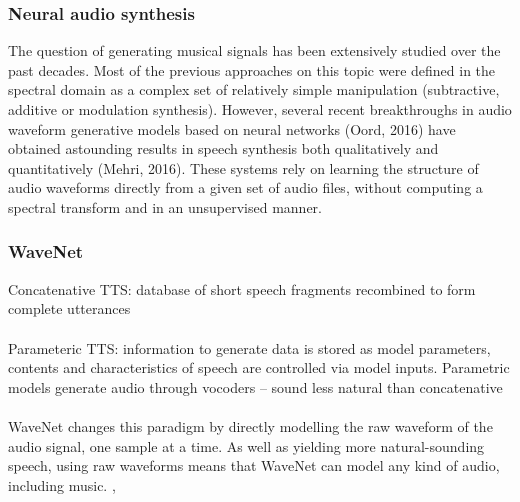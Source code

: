 \documentclass{beamer}
\begin{document}
\begin{frame}
\frametitle{Neural audio synthesis}
	The question of generating musical signals has been extensively studied over the past decades. Most of the previous approaches on this topic were defined in the spectral domain as a complex set of relatively simple manipulation (subtractive, additive or modulation synthesis). However, several recent breakthroughs in audio waveform generative models based on neural networks (Oord, 2016) have obtained astounding results in speech synthesis both qualitatively and quantitatively (Mehri, 2016). These systems rely on learning the structure of audio waveforms directly from a given set of audio files, without computing a spectral transform and in an unsupervised manner.
\end{frame}


\begin{frame}
	\frametitle{WaveNet}
	Concatenative TTS: database of short speech fragments recombined to form complete utterances\\\ \\

	Parameteric TTS: information to generate data is stored as model parameters, contents and characteristics of speech are controlled via model inputs. Parametric models generate audio through vocoders -- sound less natural than concatenative\\\ \\

	WaveNet changes this paradigm by directly modelling the raw waveform of the audio signal, one sample at a time. As well as yielding more natural-sounding speech, using raw waveforms means that WaveNet can model any kind of audio, including music. , 
\end{frame}

\end{document}
